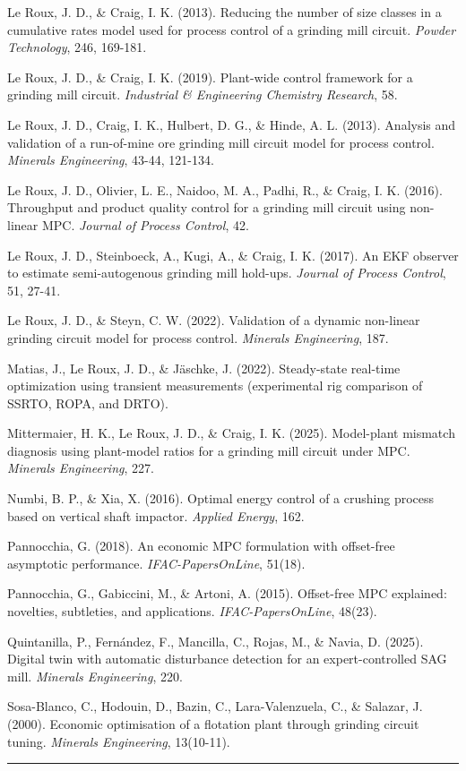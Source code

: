 \documentclass[
  14pt,
]{extarticle}
\begin{document}
Le Roux, J. D., \& Craig, I. K. (2013). Reducing the number of size
classes in a cumulative rates model used for process control of a
grinding mill circuit. \emph{Powder Technology}, 246, 169-181.

Le Roux, J. D., \& Craig, I. K. (2019). Plant-wide control framework for
a grinding mill circuit. \emph{Industrial \& Engineering Chemistry
Research}, 58.

Le Roux, J. D., Craig, I. K., Hulbert, D. G., \& Hinde, A. L. (2013).
Analysis and validation of a run-of-mine ore grinding mill circuit model
for process control. \emph{Minerals Engineering}, 43-44, 121-134.

Le Roux, J. D., Olivier, L. E., Naidoo, M. A., Padhi, R., \& Craig, I.
K. (2016). Throughput and product quality control for a grinding mill
circuit using non-linear MPC. \emph{Journal of Process Control}, 42.

Le Roux, J. D., Steinboeck, A., Kugi, A., \& Craig, I. K. (2017). An EKF
observer to estimate semi-autogenous grinding mill hold-ups.
\emph{Journal of Process Control}, 51, 27-41.

Le Roux, J. D., \& Steyn, C. W. (2022). Validation of a dynamic
non-linear grinding circuit model for process control. \emph{Minerals
Engineering}, 187.

Matias, J., Le Roux, J. D., \& Jäschke, J. (2022). Steady-state
real-time optimization using transient measurements (experimental rig
comparison of SSRTO, ROPA, and DRTO).

Mittermaier, H. K., Le Roux, J. D., \& Craig, I. K. (2025). Model-plant
mismatch diagnosis using plant-model ratios for a grinding mill circuit
under MPC. \emph{Minerals Engineering}, 227.

Numbi, B. P., \& Xia, X. (2016). Optimal energy control of a crushing
process based on vertical shaft impactor. \emph{Applied Energy}, 162.

Pannocchia, G. (2018). An economic MPC formulation with offset-free
asymptotic performance. \emph{IFAC-PapersOnLine}, 51(18).

Pannocchia, G., Gabiccini, M., \& Artoni, A. (2015). Offset-free MPC
explained: novelties, subtleties, and applications.
\emph{IFAC-PapersOnLine}, 48(23).

Quintanilla, P., Fernández, F., Mancilla, C., Rojas, M., \& Navia, D.
(2025). Digital twin with automatic disturbance detection for an
expert-controlled SAG mill. \emph{Minerals Engineering}, 220.

Sosa-Blanco, C., Hodouin, D., Bazin, C., Lara-Valenzuela, C., \&
Salazar, J. (2000). Economic optimisation of a flotation plant through
grinding circuit tuning. \emph{Minerals Engineering}, 13(10-11).

\begin{center}\rule{0.5\linewidth}{0.5pt}\end{center}
\end{document}
